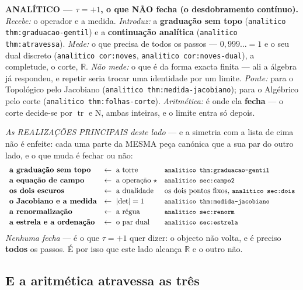 \documentclass[11pt,a4paper]{article}
\newcommand{\code}[1]{\texttt{\small #1}}
\newcommand{\abs}[1]{\lvert #1\rvert}
\begin{document}
\noindent\textbf{ANALÍTICO --- $\tau=+1$, o que NÃO fecha (o desdobramento contínuo).}
\emph{Recebe:} o operador e a medida. \emph{Introduz:} a \textbf{graduação sem topo}
(\code{analitico thm:graduacao-gentil}) e a \textbf{continuação analítica} (\code{analitico thm:atravessa}).
\emph{Mede:} o que precisa de todos os passos --- $0{,}999\ldots=1$ e o seu dual discreto
(\code{analitico cor:noves}, \code{analitico cor:noves-dual}), a completude, o corte, $\mathbb{R}$.
\emph{Não mede:} o que é da forma exacta finita --- ali a álgebra já respondeu, e repetir
seria trocar uma identidade por um limite. \emph{Ponte:} para o Topológico pelo Jacobiano
(\code{analitico thm:medida-jacobiano}); para o Algébrico pelo corte
(\code{analitico thm:folhas-corte}). \emph{Aritmética:} é onde ela \textbf{fecha} --- o corte
decide-se por $\operatorname{tr}$ e $\mathrm{N}$, ambas inteiras, e o limite entra só
depois.

\smallskip
\noindent\emph{As REALIZAÇÕES PRINCIPAIS deste lado} --- e a simetria com a lista de cima
não é enfeite: cada uma parte da MESMA peça canónica que a sua par do outro lado, e o que
muda é fechar ou não:
\[
\begin{array}{lll}
\textbf{a graduação sem topo} & \leftarrow\ \text{a torre} &
\text{\code{analitico thm:graduacao-gentil}}\\[2pt]
\textbf{a equação de campo} & \leftarrow\ \text{a operação }\star &
\text{\code{analitico sec:campo2}}\\[2pt]
\textbf{os dois escuros} & \leftarrow\ \text{a dualidade} &
\text{os dois pontos fixos, \code{analitico sec:dois}}\\[2pt]
\textbf{o Jacobiano e a medida} & \leftarrow\ \abs{\det}=1 &
\text{\code{analitico thm:medida-jacobiano}}\\[2pt]
\textbf{a renormalização} & \leftarrow\ \text{a régua} &
\text{\code{analitico sec:renorm}}\\[2pt]
\textbf{a estrela e a ordenação} & \leftarrow\ \text{o par dual} &
\text{\code{analitico sec:estrela}}
\end{array}
\]
\emph{Nenhuma fecha} --- é o que $\tau=+1$ quer dizer: o objecto não volta, e é preciso
\textbf{todos} os passos. É por isso que este lado alcança $\mathbb{R}$ e o outro não.

\subsection*{E a aritmética atravessa as três}
\end{document}
